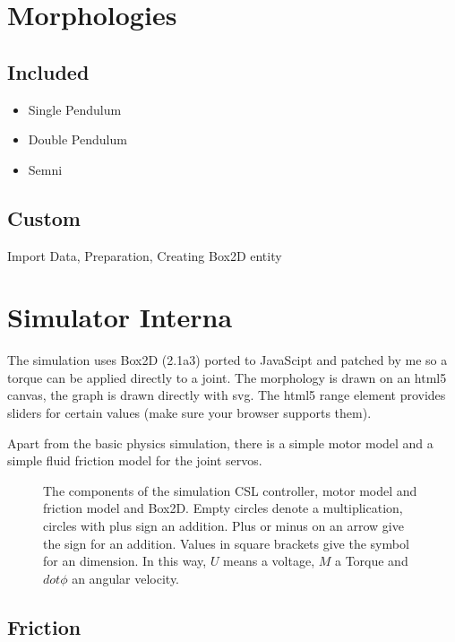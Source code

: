 \documentclass[10pt,a4paper]{article}
\begin{document}
\section{Morphologies}
\subsection{Included}
\begin{itemize}
\item Single Pendulum
\item Double Pendulum
\item Semni
\end{itemize}

\subsection{Custom}

Import Data, Preparation, Creating Box2D entity

\section{Simulator Interna}
\label{sim_internal}

The simulation uses Box2D (2.1a3) ported to JavaScipt and patched by me so a torque
can be applied directly to a joint.
The morphology is drawn on an html5 canvas, the graph is drawn directly with svg.
The html5 range element provides sliders for certain values (make sure your browser supports them).

Apart from the basic physics simulation, there is a simple motor model and a simple fluid friction model for the joint servos.

\begin{figure}[H]
    \centering
    
    \caption{The components of the simulation CSL controller, motor model and
    friction model and Box2D. Empty circles denote a multiplication, circles with plus sign
    an addition. Plus or minus on an arrow give the sign for an addition.
    Values in square brackets give the symbol for an dimension. In this way, $U$ means
    a voltage, $M$ a Torque and $dot{\phi}$ an angular velocity.}
    \label{fig:controllermodell}
\end{figure}

\subsection{Friction}
\end{document}
